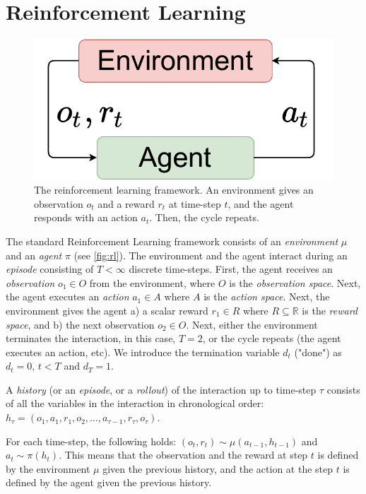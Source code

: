 \documentclass[a4paper,11pt,oneside]{report}
\begin{document}
\section{Reinforcement Learning}
\label{sec:rl}
\begin{figure}
    \centering
    \includegraphics[width=0.7\linewidth]{diagrams/rl}
    \caption{The reinforcement learning framework. An environment gives an observation $o_t$ and a reward $r_t$ at time-step $t$, and the agent responds with an action $a_t$. Then, the cycle repeats.}
    \label{fig:rl}
\end{figure}


The standard Reinforcement Learning framework consists of an {\em environment} $\mu$ and an {\em agent} $\pi$ (see \autoref{fig:rl}). The environment and the agent interact during an {\em episode} consisting of $T<\infty$ discrete time-steps. First, the agent receives an {\em observation} $o_1\in O$ from the environment, where $O$ is the {\em observation space}. Next, the agent executes an {\em action} $a_1\in A$ where $A$ is the {\em action space}. Next, the environment gives the agent a) a scalar reward $r_1\in R$ where $R\subseteq \mathbb R$ is the {\em reward space}, and b) the next observation $o_2\in O$. Next, either the environment terminates the interaction, in this case, $T=2$, or the cycle repeats (the agent executes an action, etc). We introduce the termination variable $d_t$ ("done") as $d_t=0$, $t<T$ and $d_T=1$.

A {\em history} (or an {\em episode}, or a {\em rollout}) of the interaction up to time-step $\tau$ consists of all the variables in the interaction in chronological order: $h_{\tau}=(o_1, a_1, r_1, o_2, ..., a_{\tau-1}, r_{\tau}, o_{\tau})$.

For each time-step, the following holds: $(o_t, r_t)\sim \mu(a_{t-1}, h_{t-1})$ and $a_t\sim \pi(h_{t})$. This means that the observation and the reward at step $t$ is defined by the environment $\mu$ given the previous history, and the action at the step $t$ is defined by the agent given the previous history.
\end{document}
